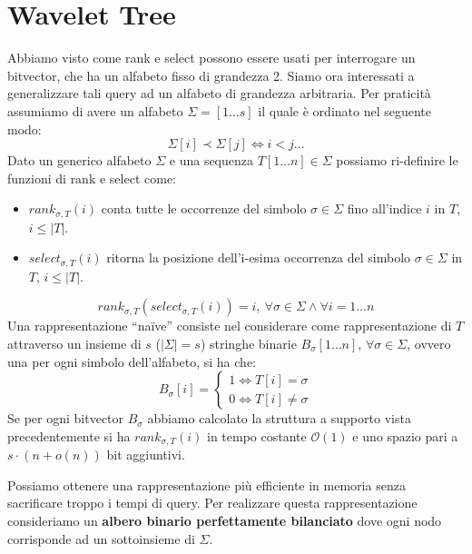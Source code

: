 \section{Wavelet Tree}
Abbiamo visto come rank e select possono essere usati per interrogare un bitvector,
che ha un alfabeto fisso di grandezza 2. Siamo ora interessati a generalizzare
tali query ad un alfabeto di grandezza arbitraria. Per praticità assumiamo di
avere un alfabeto $\Sigma = [1 \dots s]$ il quale è ordinato nel seguente modo:
\begin{equation}
    \Sigma[i] \prec \Sigma[j] \iff i < j \dots
\end{equation}
Dato un generico alfabeto $\Sigma$ e una sequenza $T[1\dots n] \in \Sigma$ possiamo
ri-definire le funzioni di rank e select come:
\begin{itemize}
    \item $rank_{\sigma,T} (i)$ conta tutte le occorrenze del simbolo $\sigma
              \in \Sigma$ fino all'indice $i$ in $T$, $i \leq | T |$.
    \item $select_{\sigma,T} (i)$ ritorna la posizione dell'i-esima occorrenza
          del simbolo $\sigma \in \Sigma$ in $T$, $i \leq | T |$.
\end{itemize}
\begin{equation}
    rank_{\sigma,T} (select_{\sigma,T} (i)) = i, \ \forall \sigma \in \Sigma
    \land \forall i = 1 \dots n
\end{equation}
Una rappresentazione ``naïve'' consiste nel considerare come rappresentazione di
$T$ attraverso un insieme di $s$ ($| \Sigma | = s$) stringhe binarie $B_\sigma[1
        \dots n]$, $\forall \sigma \in \Sigma$, ovvero una per ogni simbolo
dell'alfabeto, si ha che:
\begin{equation}
    B_\sigma[i] = \begin{cases}
        1 \iff T[i] = \sigma \\
        0 \iff T[i] \neq \sigma
    \end{cases}
\end{equation}
Se per ogni bitvector $B_\sigma$ abbiamo calcolato la struttura a supporto vista
precedentemente si ha $rank_{\sigma,T} (i)$ in tempo costante $\mathcal{O}(1)$ e
uno spazio pari a $s \cdot (n + o(n))$ bit aggiuntivi.

Possiamo ottenere una rappresentazione più efficiente in memoria senza sacrificare
troppo i tempi di query. Per realizzare questa rappresentazione consideriamo un
\textbf{albero binario perfettamente bilanciato} dove ogni nodo corrisponde ad un
sottoinsieme di $\Sigma$.

